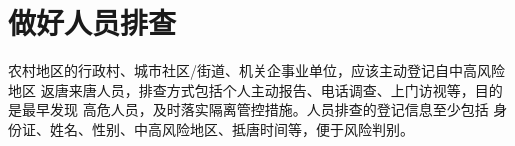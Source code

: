 \section{做好人员排查}
农村地区的行政村、城市社区/街道、机关企事业单位，应该主动登记自中高风险地区
返唐来唐人员，排查方式包括个人主动报告、电话调查、上门访视等，目的是最早发现
高危人员，及时落实隔离管控措施。人员排查的登记信息至少包括
身份证、姓名、性别、中高风险地区、抵唐时间等，便于风险判别。

